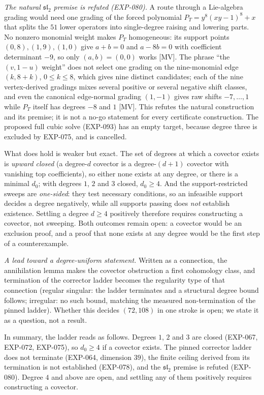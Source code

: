 \documentclass[11pt]{article}
\theoremstyle{remark}
\begin{document}
\emph{The natural $\mathfrak{sl}_2$ premise is refuted (EXP-080).} A route through a Lie-algebra grading
would need one grading of the forced polynomial $P_T=y^8(xy-1)^8+x$ that splits the $51$ lower operators into single-degree
raising and lowering parts. No nonzero monomial weight makes $P_T$ homogeneous: its support points $(0,8),(1,9),(1,0)$ give
$a+b=0$ and $a-8b=0$ with coefficient determinant $-9$, so only $(a,b)=(0,0)$ works [MV]. The phrase ``the $(v,1-u)$ weight'' does not select one grading on the
nine-monomial edge $(k,8+k)$, $0\le k\le 8$, which gives nine distinct candidates; each of the nine vertex-derived gradings mixes several positive or
several negative shift classes, and even the canonical edge-normal grading $(1,-1)$ gives raw shifts $-7,\dots,1$ while $P_T$ itself has degrees $-8$ and $1$ [MV]. This refutes the
natural construction and its premise; it is not a no-go statement for every certificate construction. The proposed full cubic solve (EXP-093) has an empty target, because degree three is excluded by EXP-075, and is cancelled.

What does hold is weaker but exact. The set of degrees at which a covector exists
is \emph{upward closed} (a degree-$d$ covector is a degree-$(d+1)$ covector with
vanishing top coefficients), so either none exists at any degree, or there is a
minimal $d_0$; with degrees $1$, $2$ and $3$ closed, $d_0 \ge 4$. And the
support-restricted sweeps are \emph{one-sided}: they test necessary conditions, so
an infeasible support decides a degree negatively, while all supports passing does
\emph{not} establish existence. Settling a degree $d \ge 4$ positively therefore
requires constructing a covector, not sweeping. Both outcomes remain open: a
covector would be an exclusion proof, and a proof that none exists at any degree
would be the first step of a counterexample.

\emph{A lead toward a degree-uniform statement.} Written as a connection, the
annihilation lemma makes the covector obstruction a first cohomology class, and
termination of the corrector ladder becomes the regularity type of that connection
(regular singular: the ladder terminates and a structural degree bound follows;
irregular: no such bound, matching the measured non-termination of the pinned
ladder). Whether this decides $(72,108)$ in one stroke is open; we state it as a
question, not a result.

In summary, the ladder reads as follows. Degrees $1$, $2$ and $3$ are closed (EXP-067, EXP-072, EXP-075), so $d_0\ge4$ if a covector exists. The pinned corrector ladder does not terminate
(EXP-064, dimension $39$), the finite ceiling derived from its termination is not established (EXP-078), and the $\mathfrak{sl}_2$ premise is refuted (EXP-080). Degree $4$ and above are open, and
settling any of them positively requires constructing a covector.
\end{document}
